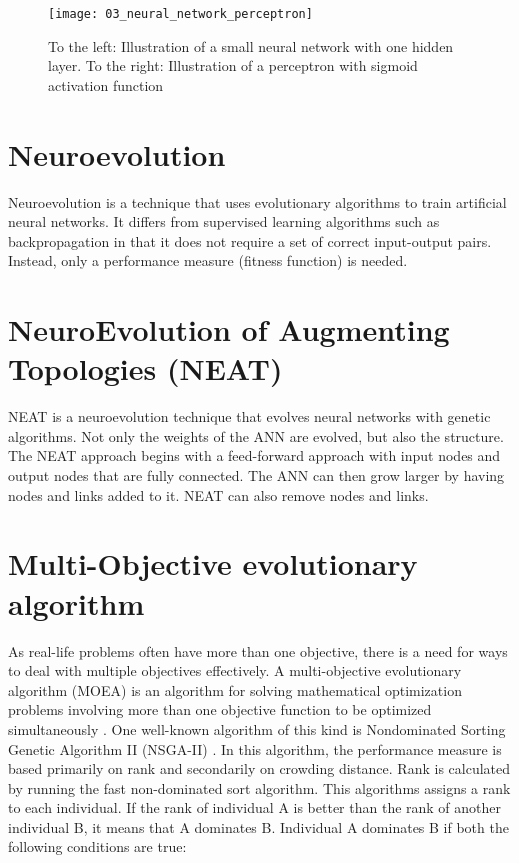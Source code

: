 \begin{figure}[h]
    \centering
    \texttt{[image: 03\_neural\_network\_perceptron]}
    \caption{To the left: Illustration of a small neural network with one hidden layer. To the right: Illustration of a perceptron with sigmoid activation function}
    \label{fig:neural_network_perceptron}
\end{figure}

\section{Neuroevolution}
Neuroevolution is a technique that uses evolutionary algorithms to train artificial neural networks. It differs from supervised learning algorithms such as backpropagation in that it does not require a set of correct input-output pairs. Instead, only a performance measure (fitness function) is needed.

\section{NeuroEvolution of Augmenting Topologies (NEAT)}
NEAT \citep{stanley2002} is a neuroevolution technique that evolves neural networks with genetic algorithms. Not only the weights of the ANN are evolved, but also the structure. The NEAT approach begins with a feed-forward approach with input nodes and output nodes that are fully connected. The ANN can then grow larger by having nodes and links added to it. NEAT can also remove nodes and links.

\iffalse
TODO:
Competing conventions
Species
Genotype (list of nodes, list of connections)
Phenotype
Crossover
Interspecies crossover
Dynamic compatibility
Min species
Max species
Aging species
Innovations
Young age fitness boost
Species stagnation
Competitive coevolution stagnation
Kill worst species each 15 generations
Survival rate
Elitism
Tournament selection
Sexual vs asexual reproduction?
Mutation operations
\fi

\section{Multi-Objective evolutionary algorithm}
As real-life problems often have more than one objective, there is a need for ways to deal with multiple objectives effectively. A multi-objective evolutionary algorithm (MOEA) is an algorithm for solving mathematical optimization problems involving more than one objective function to be optimized simultaneously \citep{veldhuizen2000}. One well-known algorithm of this kind is Nondominated Sorting Genetic Algorithm II (NSGA-II) \citep{nsga2}. In this algorithm, the performance measure is based primarily on rank and secondarily on crowding distance. Rank is calculated by running the fast non-dominated sort algorithm. This algorithms assigns a rank to each individual. If the rank of individual A is better than the rank of another individual B, it means that A dominates B. Individual A dominates B if both the following conditions are true:


